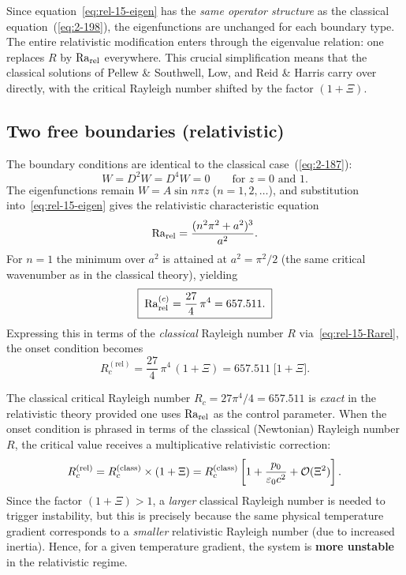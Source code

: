 Since equation~\eqref{eq:rel-15-eigen} has the \emph{same operator
structure} as the classical equation~(\ref{eq:2-198}), the
eigenfunctions are unchanged for each boundary type. The entire
relativistic modification enters through the eigenvalue relation: one
replaces $R$ by $\mathrm{Ra}_{\mathrm{rel}}$ everywhere. This crucial simplification means
that the classical solutions of Pellew \& Southwell, Low, and Reid \&
Harris carry over directly, with the critical Rayleigh number shifted
by the factor $(1+\Xi)$.


\subsection{Two free boundaries (relativistic)}
\label{sec:rel-15a}

The boundary conditions are identical to the classical case~(\ref{eq:2-187}):
\begin{equation}
\label{eq:rel-15-bc-free}
W = D^{2}W = D^{4}W = 0 \qquad\text{for } z = 0 \text{ and } 1.
\end{equation}
The eigenfunctions remain $W = A\sin n\pi z$ ($n = 1,2,\ldots$), and
substitution into~\eqref{eq:rel-15-eigen} gives the relativistic
characteristic equation
\begin{equation}
\label{eq:rel-15-Rfree}
\mathrm{Ra}_{\mathrm{rel}} = \frac{(n^{2}\pi^{2}+a^{2})^{3}}{a^{2}}.
\end{equation}
For $n = 1$ the minimum over $a^{2}$ is attained at $a^{2} = \pi^{2}/2$
(the same critical wavenumber as in the classical theory), yielding
\begin{equation}
\label{eq:rel-15-Rcfree}
\boxed{\;
\mathrm{Ra}_{\mathrm{rel}}^{(c)} = \frac{27}{4}\,\pi^{4} = 657.511.
\;}
\end{equation}
Expressing this in terms of the \emph{classical} Rayleigh number $R$
via~\eqref{eq:rel-15-Rarel}, the onset condition becomes
\begin{equation}
\label{eq:rel-15-Rcfree-classical}
R_{c}^{(\mathrm{rel})} = \frac{27}{4}\,\pi^{4}\,(1+\Xi)
  = 657.511\;\bigl[1 + \Xi\bigr].
\end{equation}

\begin{relcorrection}
The classical critical Rayleigh number $R_{c} = 27\pi^{4}/4 = 657.511$
is \emph{exact} in the relativistic theory provided one uses $\mathrm{Ra}_{\mathrm{rel}}$
as the control parameter. When the onset condition is phrased in terms
of the classical (Newtonian) Rayleigh number $R$, the critical value
receives a multiplicative relativistic correction:
\[
R_{c}^{(\mathrm{rel})} = R_{c}^{(\mathrm{class})}
  \times (1+\Xi)
  = R_{c}^{(\mathrm{class})}
    \left[1 + \frac{p_{0}}{\varepsilon_{0}c^{2}}
    + \mathcal{O}(\Xi^2)\right].
\]
Since the factor $(1+\Xi) > 1$, a \emph{larger} classical
Rayleigh number is needed to trigger instability, but this is precisely
because the same physical temperature gradient corresponds to a
\emph{smaller} relativistic Rayleigh number (due to increased inertia).
Hence, for a given temperature gradient, the system is \textbf{more
unstable} in the relativistic regime.
\end{relcorrection}


